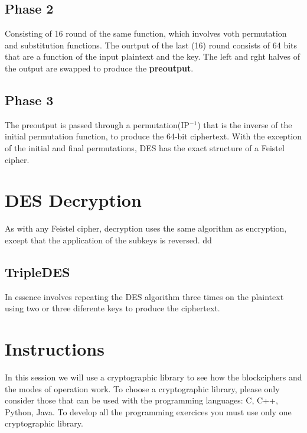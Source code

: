 \documentclass[12pt]{article}
\begin{document}
        \subsection{Phase 2}
            Consisting of 16 round of the same function, which involves voth permutation and substitution functions. The ourtput of the last (16) round consists of 64 bits that are a function of the input plaintext and the key. The left and rght halves of the output are swapped to produce the \textbf{preoutput}.


        \subsection{Phase 3}
            The preoutput is passed through a permutation(IP$^{-1}$) that is the inverse of the initial permutation function, to produce the 64-bit ciphertext. With the exception of the initial and final permutations, DES has the exact structure of a Feistel cipher.

    \section{DES Decryption}
        As with any Feistel cipher, decryption uses the same algorithm as encryption, except that the application of the subkeys is reversed.
        dd

        \subsection{TripleDES}
            In essence involves repeating the DES algorithm three times on the plaintext using two or three diferente keys to produce the ciphertext.

    \section{Instructions}
        In this session we will use a cryptographic library to see how the blockciphers and the modes of operation work. To choose a cryptographic library, please only consider those that can be used with the programming languages: C, C++, Python, Java. To develop all the programming exercices you must use only one cryptographic library.
\end{document}
